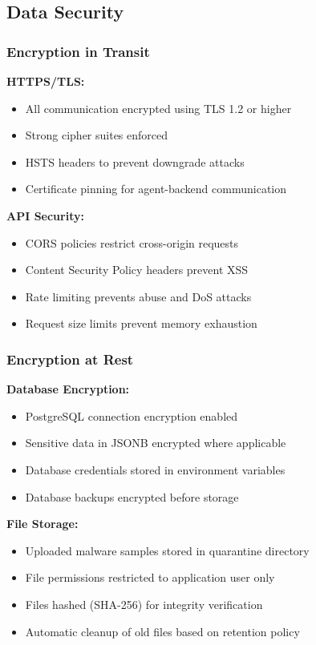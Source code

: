 \subsection{Data Security}

\subsubsection{Encryption in Transit}

\textbf{HTTPS/TLS:}
\begin{itemize}
    \item All communication encrypted using TLS 1.2 or higher
    \item Strong cipher suites enforced
    \item HSTS headers to prevent downgrade attacks
    \item Certificate pinning for agent-backend communication
\end{itemize}

\textbf{API Security:}
\begin{itemize}
    \item CORS policies restrict cross-origin requests
    \item Content Security Policy headers prevent XSS
    \item Rate limiting prevents abuse and DoS attacks
    \item Request size limits prevent memory exhaustion
\end{itemize}

\subsubsection{Encryption at Rest}

\textbf{Database Encryption:}
\begin{itemize}
    \item PostgreSQL connection encryption enabled
    \item Sensitive data in JSONB encrypted where applicable
    \item Database credentials stored in environment variables
    \item Database backups encrypted before storage
\end{itemize}

\textbf{File Storage:}
\begin{itemize}
    \item Uploaded malware samples stored in quarantine directory
    \item File permissions restricted to application user only
    \item Files hashed (SHA-256) for integrity verification
    \item Automatic cleanup of old files based on retention policy
\end{itemize}

